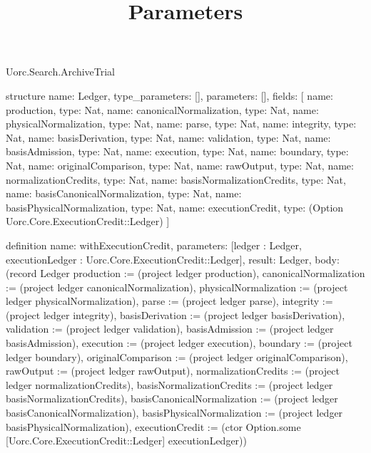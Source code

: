 \begin{lexlean}{Uorc.Search.ArchiveTrial}
\title{Parameters}
\begin{semanticmodule}
structure{
  name: Ledger,
  type_parameters: [],
  parameters: [],
  fields: [
    {name: production, type: Nat},
    {name: canonicalNormalization, type: Nat},
    {name: physicalNormalization, type: Nat},
    {name: parse, type: Nat},
    {name: integrity, type: Nat},
    {name: basisDerivation, type: Nat},
    {name: validation, type: Nat},
    {name: basisAdmission, type: Nat},
    {name: execution, type: Nat},
    {name: boundary, type: Nat},
    {name: originalComparison, type: Nat},
    {name: rawOutput, type: Nat},
    {name: normalizationCredits, type: Nat},
    {name: basisNormalizationCredits, type: Nat},
    {name: basisCanonicalNormalization, type: Nat},
    {name: basisPhysicalNormalization, type: Nat},
    {name: executionCredit, type: (Option Uorc.Core.ExecutionCredit::Ledger)}
  ]
}

definition{
  name: withExecutionCredit,
  parameters: [ledger : Ledger, executionLedger : Uorc.Core.ExecutionCredit::Ledger],
  result: Ledger,
  body: (record Ledger {production := (project ledger production), canonicalNormalization := (project ledger canonicalNormalization), physicalNormalization := (project ledger physicalNormalization), parse := (project ledger parse), integrity := (project ledger integrity), basisDerivation := (project ledger basisDerivation), validation := (project ledger validation), basisAdmission := (project ledger basisAdmission), execution := (project ledger execution), boundary := (project ledger boundary), originalComparison := (project ledger originalComparison), rawOutput := (project ledger rawOutput), normalizationCredits := (project ledger normalizationCredits), basisNormalizationCredits := (project ledger basisNormalizationCredits), basisCanonicalNormalization := (project ledger basisCanonicalNormalization), basisPhysicalNormalization := (project ledger basisPhysicalNormalization), executionCredit := (ctor Option.some [Uorc.Core.ExecutionCredit::Ledger] executionLedger)})
}


\end{semanticmodule}
\end{lexlean}
